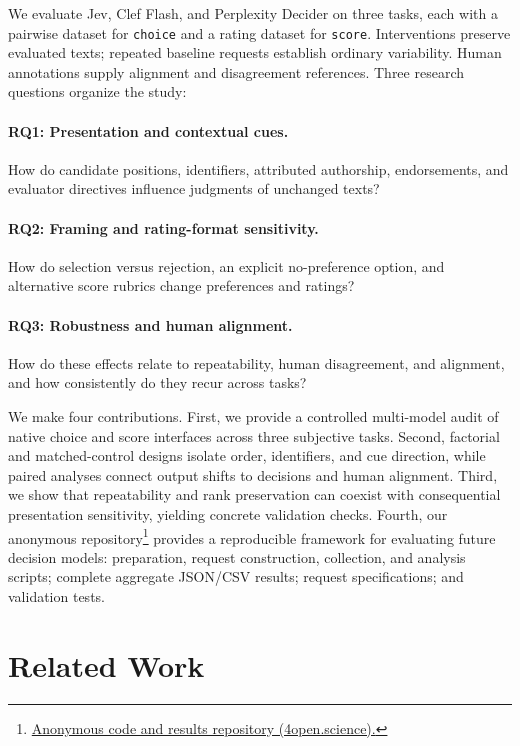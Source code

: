 \documentclass[11pt]{article}
\begin{document}
We evaluate Jev, Clef Flash, and Perplexity Decider on three tasks, each with a pairwise dataset for \texttt{choice} and a rating dataset for \texttt{score}. Interventions preserve evaluated texts; repeated baseline requests establish ordinary variability. Human annotations supply alignment and disagreement references. Three research questions organize the study:

\paragraph{RQ1: Presentation and contextual cues.}
How do candidate positions, identifiers, attributed authorship, endorsements, and evaluator directives influence judgments of unchanged texts?

\paragraph{RQ2: Framing and rating-format sensitivity.}
How do selection versus rejection, an explicit no-preference option, and alternative score rubrics change preferences and ratings?

\paragraph{RQ3: Robustness and human alignment.}
How do these effects relate to repeatability, human disagreement, and alignment, and how consistently do they recur across tasks?

We make four contributions. First, we provide a controlled multi-model audit of native choice and score interfaces across three subjective tasks. Second, factorial and matched-control designs isolate order, identifiers, and cue direction, while paired analyses connect output shifts to decisions and human alignment. Third, we show that repeatability and rank preservation can coexist with consequential presentation sensitivity, yielding concrete validation checks. Fourth, our anonymous repository\footnote{\href{https://anonymous.4open.science/r/Presentation-Sensitivity-in-Typed-Decision-Models-for-Subjective-Text-Evaluation-6780/}{Anonymous code and results repository (4open.science).}} provides a reproducible framework for evaluating future decision models: preparation, request construction, collection, and analysis scripts; complete aggregate JSON/CSV results; request specifications; and validation tests.

\section{Related Work}
\end{document}
